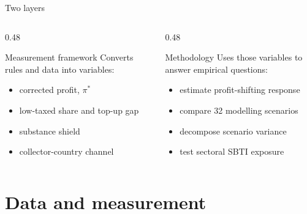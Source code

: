 \documentclass[aspectratio=169, 11pt]{beamer}
\begin{document}
\begin{frame}{Two layers}
\small
\begin{columns}[T]
\begin{column}{0.48\textwidth}
\begin{block}{Measurement framework}
  Converts rules and data into variables:
  \begin{itemize}
    \item corrected profit, $\pi^{*}$
    \item low-taxed share and top-up gap
    \item substance shield
    \item collector-country channel
  \end{itemize}
\end{block}
\end{column}
\begin{column}{0.48\textwidth}
\begin{exampleblock}{Methodology}
  Uses those variables to answer empirical questions:
  \begin{itemize}
    \item estimate profit-shifting response
    \item compare 32 modelling scenarios
    \item decompose scenario variance
    \item test sectoral SBTI exposure
  \end{itemize}
\end{exampleblock}
\end{column}
\end{columns}

\vspace{0.4em}
\end{frame}

\section{Data and measurement}
\end{document}
